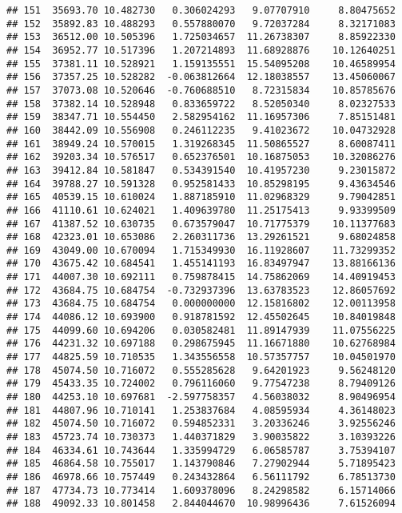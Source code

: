 \documentclass[
]{article}
\begin{document}
\begin{verbatim}
## 151  35693.70 10.482730   0.306024293   9.07707910     8.80475652
## 152  35892.83 10.488293   0.557880070   9.72037284     8.32171083
## 153  36512.00 10.505396   1.725034657  11.26738307     8.85922330
## 154  36952.77 10.517396   1.207214893  11.68928876    10.12640251
## 155  37381.11 10.528921   1.159135551  15.54095208    10.46589954
## 156  37357.25 10.528282  -0.063812664  12.18038557    13.45060067
## 157  37073.08 10.520646  -0.760688510   8.72315834    10.85785676
## 158  37382.14 10.528948   0.833659722   8.52050340     8.02327533
## 159  38347.71 10.554450   2.582954162  11.16957306     7.85151481
## 160  38442.09 10.556908   0.246112235   9.41023672    10.04732928
## 161  38949.24 10.570015   1.319268345  11.50865527     8.60087411
## 162  39203.34 10.576517   0.652376501  10.16875053    10.32086276
## 163  39412.84 10.581847   0.534391540  10.41957230     9.23015872
## 164  39788.27 10.591328   0.952581433  10.85298195     9.43634546
## 165  40539.15 10.610024   1.887185910  11.02968329     9.79042851
## 166  41110.61 10.624021   1.409639780  11.25175413     9.93399509
## 167  41387.52 10.630735   0.673579047  10.71775379    10.11377683
## 168  42323.01 10.653086   2.260311736  13.29261521     9.68024858
## 169  43049.00 10.670094   1.715349930  16.11928607    11.73299352
## 170  43675.42 10.684541   1.455141193  16.83497947    13.88166136
## 171  44007.30 10.692111   0.759878415  14.75862069    14.40919453
## 172  43684.75 10.684754  -0.732937396  13.63783523    12.86057692
## 173  43684.75 10.684754   0.000000000  12.15816802    12.00113958
## 174  44086.12 10.693900   0.918781592  12.45502645    10.84019848
## 175  44099.60 10.694206   0.030582481  11.89147939    11.07556225
## 176  44231.32 10.697188   0.298675945  11.16671880    10.62768984
## 177  44825.59 10.710535   1.343556558  10.57357757    10.04501970
## 178  45074.50 10.716072   0.555285628   9.64201923     9.56248120
## 179  45433.35 10.724002   0.796116060   9.77547238     8.79409126
## 180  44253.10 10.697681  -2.597758357   4.56038032     8.90496954
## 181  44807.96 10.710141   1.253837684   4.08595934     4.36148023
## 182  45074.50 10.716072   0.594852331   3.20336246     3.92556246
## 183  45723.74 10.730373   1.440371829   3.90035822     3.10393226
## 184  46334.61 10.743644   1.335994729   6.06585787     3.75394107
## 185  46864.58 10.755017   1.143790846   7.27902944     5.71895423
## 186  46978.66 10.757449   0.243432864   6.56111792     6.78513730
## 187  47734.73 10.773414   1.609378096   8.24298582     6.15714066
## 188  49092.33 10.801458   2.844044670  10.98996436     7.61526094

\end{verbatim}
\end{document}
